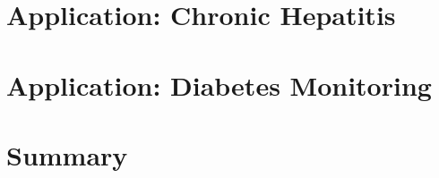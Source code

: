 \chapter{Application: Chronic Hepatitis}
\label{ch:expts}






\chapter{Application: Diabetes Monitoring}
\label{ch:expts}


\chapter{Summary}
\label{ch:summary}


